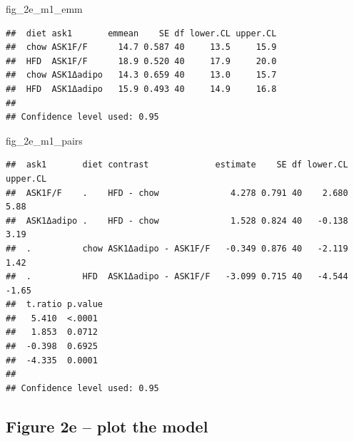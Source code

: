 \documentclass[]{book}
\newenvironment{Shaded}{\begin{snugshade}}{\end{snugshade}}
\newcommand{\NormalTok}[1]{#1}
\begin{document}
\begin{Shaded}
\begin{Highlighting}[]
\NormalTok{fig_2e_m1_emm}
\end{Highlighting}
\end{Shaded}

\begin{verbatim}
##  diet ask1       emmean    SE df lower.CL upper.CL
##  chow ASK1F/F      14.7 0.587 40     13.5     15.9
##  HFD  ASK1F/F      18.9 0.520 40     17.9     20.0
##  chow ASK1Δadipo   14.3 0.659 40     13.0     15.7
##  HFD  ASK1Δadipo   15.9 0.493 40     14.9     16.8
## 
## Confidence level used: 0.95
\end{verbatim}

\begin{Shaded}
\begin{Highlighting}[]
\NormalTok{fig_2e_m1_pairs}
\end{Highlighting}
\end{Shaded}

\begin{verbatim}
##  ask1       diet contrast             estimate    SE df lower.CL upper.CL
##  ASK1F/F    .    HFD - chow              4.278 0.791 40    2.680     5.88
##  ASK1Δadipo .    HFD - chow              1.528 0.824 40   -0.138     3.19
##  .          chow ASK1Δadipo - ASK1F/F   -0.349 0.876 40   -2.119     1.42
##  .          HFD  ASK1Δadipo - ASK1F/F   -3.099 0.715 40   -4.544    -1.65
##  t.ratio p.value
##   5.410  <.0001 
##   1.853  0.0712 
##  -0.398  0.6925 
##  -4.335  0.0001 
## 
## Confidence level used: 0.95
\end{verbatim}

\hypertarget{figure-2e-plot-the-model}{%
\subsection{Figure 2e -- plot the model}\label{figure-2e-plot-the-model}}
\end{document}
